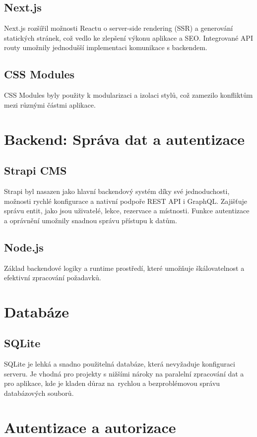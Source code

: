 \documentclass[12pt, a4paper,
openright
]{report}
\begin{document}
\subsection{Next.js}
Next.js rozšířil možnosti Reactu o server-side rendering (SSR) a generování statických stránek, což vedlo ke zlepšení výkonu aplikace a SEO.
Integrované API routy umožnily jednodušší implementaci komunikace s backendem.
\subsection{CSS Modules}
    CSS Modules byly použity k modularizaci a izolaci stylů, což zamezilo konfliktům mezi různými částmi aplikace.
    
    \section{Backend: Správa dat a autentizace
} 
    
\subsection{Strapi CMS}
Strapi byl nasazen jako hlavní backendový systém díky své jednoduchosti, možnosti rychlé konfigurace a nativní podpoře REST API i GraphQL.
Zajišťuje správu entit, jako jsou uživatelé, lekce, rezervace a místnosti.
Funkce autentizace a oprávnění umožnily snadnou správu přístupu k datům.
\subsection{Node.js}
    Základ backendové logiky a runtime prostředí, které umožňuje škálovatelnost a efektivní zpracování požadavků.

    \section{Databáze} 
    
\subsection{SQLite}
SQLite je lehká a snadno použitelná databáze, která nevyžaduje konfiguraci serveru.
Je vhodná pro projekty s nižšími nároky na paralelní zpracování dat a pro aplikace, kde je kladen důraz na~rychlou a bezproblémovou správu databázových souborů.
\section{Autentizace a autorizace} 
    
\end{document}

